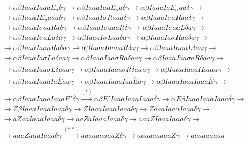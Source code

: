 \begin{ejercicio}
\begin{enumerate}
\begin{align*}
                  &\rightarrow \alpha\beta IaaaIaaaE_{\sigma}\delta\gamma \rightarrow \alpha\beta IaaaIaaE_{\sigma}a\delta\gamma\rightarrow \alpha\beta IaaaIaE_{\sigma}aa\delta\gamma \rightarrow \\
                  &\rightarrow \alpha\beta IaaaIE_{\sigma}aaa\delta\gamma\rightarrow \alpha\beta IaaaI\sigma R aaa\delta\gamma\rightarrow\alpha\beta IaaaI\sigma aRaa\delta\gamma \rightarrow \\
                  &\rightarrow\alpha\beta IaaaI\sigma aaRa\delta\gamma\rightarrow\alpha\beta IaaaI\sigma aaaR\delta\gamma\rightarrow \alpha\beta IaaaI\sigma aaL\delta a\gamma\rightarrow \\
                  &\rightarrow \alpha\beta IaaaI\sigma aLa\delta a\gamma \rightarrow \alpha\beta IaaaI\sigma Laa\delta a\gamma\rightarrow \alpha\beta IaaaIa\sigma R aa\delta a \gamma \rightarrow \\
                  &\rightarrow \alpha\beta IaaaIa\sigma aRa \delta a\gamma\rightarrow\alpha\beta IaaaIa\sigma aaR\delta a \gamma \rightarrow \alpha \beta IaaaIa\sigma aL\delta aa \gamma \rightarrow \\
                  &\rightarrow\alpha\beta IaaaIa\sigma La\delta aa\gamma\rightarrow\alpha\beta IaaaIaa\sigma Ra\delta aa\gamma\rightarrow \alpha\beta IaaaIaa\sigma aR\delta aa\gamma\rightarrow \\
                  &\rightarrow\alpha\beta IaaaIaa\sigma L\delta aaa\gamma \rightarrow \alpha\beta IaaaIaaa\sigma R\delta aaa\gamma\rightarrow \alpha\beta IaaaIaaaI\overline{E}aaa\gamma \rightarrow \\
                  &\rightarrow \alpha\beta IaaaIaaaIa\overline{E}aa\gamma\rightarrow\alpha\beta IaaaIaaaIaa\overline{E}a\gamma\rightarrow\alpha\beta IaaaIaaaIaaa\overline{E}\gamma\rightarrow \\
                  &\rightarrow \alpha\beta IaaaIaaaIaaaE'\delta\gamma \stackrel{(\ast)}{\rightarrow} \alpha\beta E' IaaaIaaaIaaa\delta\gamma \rightarrow \alpha E\beta IaaaIaaaIaaa\delta\gamma \rightarrow \\
                  &\rightarrow Z\beta IaaaIaaaIaaa\delta\gamma\rightarrow ZIaaaIaaaIaaa\delta\gamma \rightarrow ZaaaIaaaIaaa\delta\gamma\rightarrow \\
                  &\rightarrow aZaaIaaaIaaa\delta\gamma\rightarrow aaZaIaaaIaaa\delta\gamma\rightarrow aaaZIaaaIaaa\delta\gamma\rightarrow \\
                  &\rightarrow aaaZaaaIaaa\delta\gamma \stackrel{(\ast\ast)}{\rightarrow} aaaaaaaaaZ\delta\gamma \rightarrow aaaaaaaaa Z\gamma\rightarrow aaaaaaaaa

\end{align*}
\end{enumerate}
\end{ejercicio}
